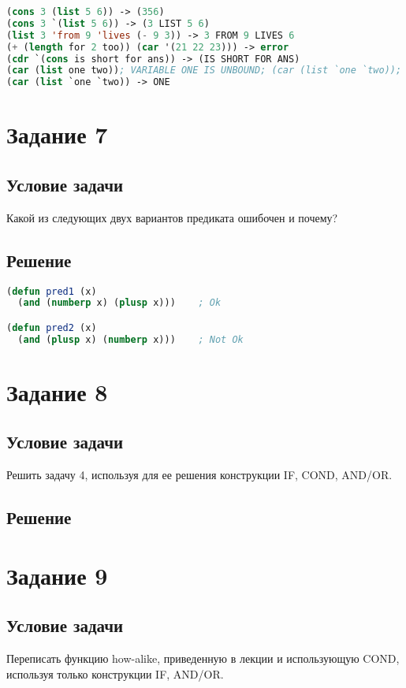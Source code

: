 \begin{lstlisting}[label=6xd,caption=Решение задания №6, language=lisp]
(cons 3 (list 5 6)) -> (356)
(cons 3 `(list 5 6)) -> (3 LIST 5 6)
(list 3 'from 9 'lives (- 9 3)) -> 3 FROM 9 LIVES 6
(+ (length for 2 too)) (car '(21 22 23))) -> error
(cdr `(cons is short for ans)) -> (IS SHORT FOR ANS)
(car (list one two)); VARIABLE ONE IS UNBOUND; (car (list `one `two)); -> ONE
(car (list `one `two)) -> ONE
\end{lstlisting}

\section*{Задание 7}
\subsection*{Условие задачи}
Какой из следующих двух вариантов предиката ошибочен и почему?

\subsection*{Решение}

\begin{lstlisting}[label=7xd,caption=Решение задания №7, language=lisp]
(defun pred1 (x)
  (and (numberp x) (plusp x)))    ; Ok

(defun pred2 (x)
  (and (plusp x) (numberp x)))    ; Not Ok 
\end{lstlisting}

\section*{Задание 8}
\subsection*{Условие задачи}
Решить задачу 4, используя для ее решения конструкции IF, COND, AND/OR.


\subsection*{Решение}
%

\section*{Задание 9}
\subsection*{Условие задачи}
Переписать функцию how-alike, приведенную в лекции и использующую COND, используя только конструкции IF, AND/OR.


